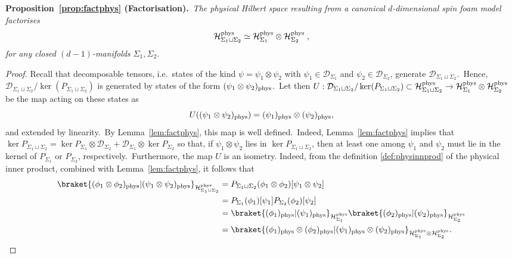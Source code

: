 \documentclass[11pt]{article}
\newcommand{\cD}{\mathcal{D}}
\newcommand{\h}{\mathcal{H}}
\theoremstyle{definition}
\numberwithin{equation}{section}
\begin{document}
\noindent
\textbf{Proposition~\ref{prop:factphys} (Factorisation).}~\emph{The physical Hilbert space resulting from a canonical $d$-dimensional spin foam model factorises
    \begin{equation*}
        \h^{\rm phys}_{\Sigma_1\sqcup\Sigma_2}\simeq\h^{\rm phys}_{\Sigma_1}\otimes \h^{\rm phys}_{\Sigma_2}\;,
    \end{equation*}
    for any closed $(d-1)$-manifolds $\Sigma_1,\Sigma_2$.}
\begin{proof}
    Recall that decomposable tensors, i.e.~states of the kind $\psi=\psi_1\otimes\psi_2$ with $\psi_1\in\cD_{\Sigma_1}$ and $\psi_2\in\cD_{\Sigma_2}$, generate $\cD_{\Sigma_1\sqcup\Sigma_2}$.~Hence, $\cD_{\Sigma_1\sqcup\Sigma_2}/\ker(P_{\Sigma_1\sqcup\Sigma_2})$ is generated by states of the form $(\psi_1\otimes\psi_2)_{\rm phys}$.~Let then $U:\cD_{\Sigma_1\sqcup\Sigma_2}/\ker(P_{\Sigma_1\sqcup\Sigma_2})\subset \h^{\rm phys}_{\Sigma_1\sqcup\Sigma_2}\to\h^{\rm phys}_{\Sigma_1}\otimes \h^{\rm phys}_{\Sigma_2}$ be the map acting on these states as
    \begin{equation}
        U((\psi_1\otimes\psi_2)_{\rm phys})=(\psi_1)_{\rm phys}\otimes(\psi_2)_{\rm phys},
    \end{equation}
    and extended by linearity.~By Lemma~\ref{lem:factphys}, this map is well defined.~Indeed, Lemma~\ref{lem:factphys} implies that $\ker P_{\Sigma_1\sqcup\Sigma_2}=\ker P_{\Sigma_1}\otimes \cD_{\Sigma_2}+\cD_{\Sigma_1}\otimes\ker P_{\Sigma_2}$ so that, if $\psi_1 \otimes \psi_2$ lies in $\ker P_{\Sigma_1 \sqcup \Sigma_2}$, then at least one among $\psi_1$ and $\psi_2$ must lie in the kernel of $P_{\Sigma_1}$ or $P_{\Sigma_2}$, respectively.~Furthermore, the map $U$ is an isometry. Indeed, from the definition \eqref{def:physinnprod} of the physical inner product, combined with Lemma~\ref{lem:factphys}, it follows that
    \begin{equation}
    \begin{split}
        \braket{(\phi_1\otimes\phi_2)_{\rm phys}|(\psi_1\otimes\psi_2)_{\rm phys}}_{\h^{\rm phys}_{\Sigma_1\sqcup\Sigma_2}}&=P_{\Sigma_1\sqcup\Sigma_2}(\phi_1\otimes\phi_2)[\psi_1\otimes\psi_2]\\
        &=P_{\Sigma_1}(\phi_1)[\psi_1]P_{\Sigma_2}(\phi_2)[\psi_2]\\
        &=\braket{(\phi_1)_{\rm phys}|(\psi_1)_{\rm phys}}_{\h^{\rm phys}_{\Sigma_1}}\braket{(\phi_2)_{\rm phys}|(\psi_2)_{\rm phys}}_{\h^{\rm phys}_{\Sigma_2}}\\
        &=\braket{(\phi_1)_{\rm phys}\otimes(\phi_2)_{\rm phys}|(\psi_1)_{\rm phys}\otimes(\psi_2)_{\rm phys}}_{\h^{\rm phys}_{\Sigma_1}\otimes \h^{\rm phys}_{\Sigma_2}}.

\end{split}
\end{equation}
\end{proof}
\end{document}
